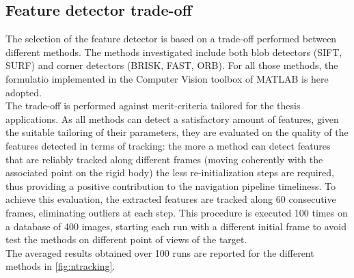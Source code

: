 \subsection{Feature detector trade-off}
The selection of the feature detector is based on a trade-off performed between different methods. The methods investigated include both blob detectors (SIFT, SURF) and corner detectors (BRISK, FAST, ORB). For all those methods, the formulatio implemented in the Computer Vision toolbox of MATLAB is here adopted.\\
The trade-off is performed against merit-criteria tailored for the thesis applications. As all methods can detect a satisfactory amount of features, given the suitable tailoring of their parameters, they are evaluated on the quality of the features detected in terms of tracking: the more a method can detect features that are reliably tracked along different frames (moving coherently with the associated point on the rigid body) the less re-initialization steps are required, thus providing a positive contribution to the navigation pipeline timeliness.  To achieve this evaluation, the extracted features are tracked along 60 consecutive frames, eliminating outliers at each step. This procedure is executed 100 times on a database of 400 images, starting each run with a different initial frame to avoid test the methods on different point of views of the target. \\
The averaged results obtained over 100 runs are reported for the different methods in \cref{fig:ntracking}.

